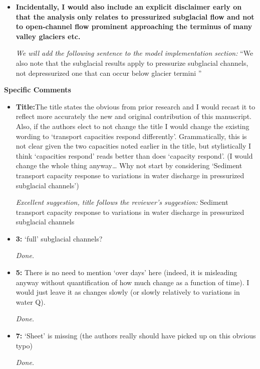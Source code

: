 \documentclass[11pt]{article}
\begin{document}
\begin{itemize}
\item   \textbf{
    Incidentally, I would also include an explicit disclaimer early on that the analysis only relates to
    pressurized subglacial flow and not to open-channel flow prominent approaching the terminus of
    many valley glaciers etc.}

   \textit{ We will add the following sentence to the model implementation section:}
``We also note that the subglacial results apply to pressurize subglacial channels, not depressurized one that can occur below glacier termini \citep{perolo2018}''
\end{itemize}

\textbf{Specific Comments}

\begin{itemize}
\item \textbf{Title:}The title states the obvious from prior research and I would recast it to
  reflect more accurately the new and original contribution of this
  manuscript. Also, if the authors elect to not change the title I would change
  the existing wording to ‘transport capacities respond differently’.
  Grammatically, this is not clear given the two capacities noted earlier in the
  title, but stylistically I think ‘capacities respond’ reads better than does
  ‘capacity respond’. (I would change the whole thing anyway… Why not start
  by considering ‘Sediment transport capacity response to variations in water
  discharge in pressurized subglacial channels’)

  \textit{Excellent suggestion, title follows the reviewer's suggestion:} Sediment transport capacity response to variations in water discharge in pressurized subglacial channels
  
\item \textbf{3:} ‘full’ subglacial channels?

  \textit{Done.}
  
\item \textbf{5:} There is no need to mention ‘over days’ here (indeed, it is misleading
  anyway without quantification of how much change as a function of time).
  I would just leave it as changes slowly (or slowly relatively to variations in
  water Q).

  \textit{Done.}

\item \textbf{7:} ‘Sheet’ is missing (the authors really should have picked up on this obvious
  typo)

  \textit{Done.}


\end{itemize}
\end{document}
